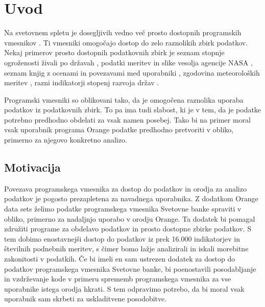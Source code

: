 
\chapter{Uvod}

Na svetovnem spletu je dosegljivih vedno več prosto dostopnih programskih
vmesnikov . 
Ti vmesniki omogočajo dostop
do zelo raznolikih zbirk podatkov. Nekaj primerov prosto dostopnih podatkovnih
zbirk je seznam stopnje ogroženosti živali po državah 
    ,
podatki meritev in slike vesolja agencije NASA
    ,
seznam knjig z ocenami in povezavami med uporabniki 
    ,
zgodovina meteoroloških meritev 
    ,
razni indikatorji stopenj razvoja držav
    .

Programski vmesniki so oblikovani tako, da je omogočena raznolika uporaba
podatkov iz podatkovnih zbirk. To pa ima tudi slabost, ki je v tem, da je 
podatke potrebno predhodno obdelati za vsak namen posebej. Tako bi na primer 
moral vsak uporabnik programa Orange podatke predhodno pretvoriti v obliko, 
primerno za njegovo konkretno analizo.


\section{Motivacija}


Povezava programskega vmesnika za dostop do podatkov in orodja za analizo 
podatkov je pogosto prezapletena za navadnega uporabnika. Z dodatkom Orange
data sets želimo podatke programskega vmesnika Svetovne banke spraviti v 
obliko, primerno za nadaljnjo
uporabo v orodju Orange. Ta dodatek bi pomagal združiti programe za obdelavo
podatkov in prosto dostopne zbirke podatkov. S tem dobimo enostavnejši dostop 
do podatkov iz prek 16.000 indikatorjev in številnih podnebnih meritev,
s čimer bomo lažje analizirali in iskali morebitne zakonitosti v podatkih.
Če bi imeli en sam ustrezen dodatek za dostop do podatkov programskega 
vmesnika Svetovne banke, bi poenostavili posodabljanje in
vzdrževanje kode v primeru sprememb programskega vmesnika za vse uporabnike
istega orodja hkrati. S tem odpravimo potrebo, da bi moral vsak uporabnik sam
skrbeti za uskladitvene posodobitve.


